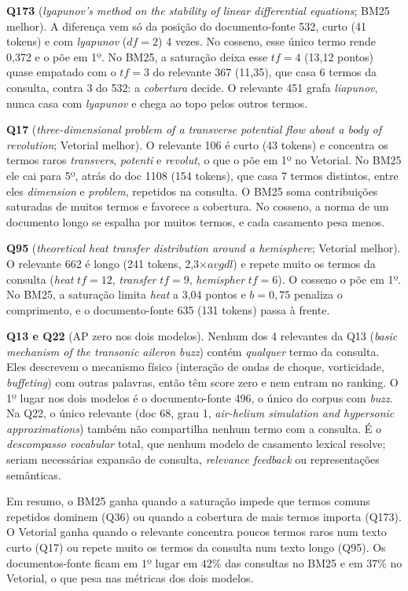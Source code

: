 \documentclass[10pt,a4paper]{article}
\newcommand{\term}[1]{\textit{#1}}      %
\begin{document}
\textbf{Q173} (\term{lyapunov's method on the stability of linear differential equations}; BM25 melhor). A diferença vem só da posição do documento-fonte 532, curto (41 tokens) e com \term{lyapunov} ($df=2$) 4 vezes. No cosseno, esse único termo rende 0,372 e o põe em 1º. No BM25, a saturação deixa esse $tf=4$ (13,12 pontos) quase empatado com o $tf=3$ do relevante 367 (11,35), que casa 6 termos da consulta, contra 3 do 532: a \emph{cobertura} decide. O relevante 451 grafa \term{liapunov}, nunca casa com \term{lyapunov} e chega ao topo pelos outros termos.

\textbf{Q17} (\term{three-dimensional problem of a transverse potential flow about a body of revolution}; Vetorial melhor). O relevante 106 é curto (43 tokens) e concentra os termos raros \term{transvers}, \term{potenti} e \term{revolut}, o que o põe em 1º no Vetorial. No BM25 ele cai para 5º, atrás do doc 1108 (154 tokens), que casa 7 termos distintos, entre eles \term{dimension} e \term{problem}, repetidos na consulta. O BM25 soma contribuições saturadas de muitos termos e favorece a cobertura. No cosseno, a norma de um documento longo se espalha por muitos termos, e cada casamento pesa menos.

\textbf{Q95} (\term{theoretical heat transfer distribution around a hemisphere}; Vetorial melhor). O relevante 662 é longo (241 tokens, 2,3$\times avgdl$) e repete muito os termos da consulta (\term{heat} $tf=12$, \term{transfer} $tf=9$, \term{hemispher} $tf=6$). O cosseno o põe em 1º. No BM25, a saturação limita \term{heat} a 3,04 pontos e $b=0{,}75$ penaliza o comprimento, e o documento-fonte 635 (131 tokens) passa à frente.

\textbf{Q13 e Q22} (AP zero nos dois modelos). Nenhum dos 4 relevantes da Q13 (\term{basic mechanism of the transonic aileron buzz}) contém \emph{qualquer} termo da consulta. Eles descrevem o mecanismo físico (interação de ondas de choque, vorticidade, \term{buffeting}) com outras palavras, então têm score zero e nem entram no ranking. O 1º lugar nos dois modelos é o documento-fonte 496, o único do corpus com \term{buzz}. Na Q22, o único relevante (doc 68, grau 1, \term{air-helium simulation and hypersonic approximations}) também não compartilha nenhum termo com a consulta. É o \emph{descompasso vocabular} total, que nenhum modelo de casamento lexical resolve; seriam necessárias expansão de consulta, \term{relevance feedback} ou representações semânticas.

Em resumo, o BM25 ganha quando a saturação impede que termos comuns repetidos dominem (Q36) ou quando a cobertura de mais termos importa (Q173). O Vetorial ganha quando o relevante concentra poucos termos raros num texto curto (Q17) ou repete muito os termos da consulta num texto longo (Q95). Os documentos-fonte ficam em 1º lugar em 42\% das consultas no BM25 e em 37\% no Vetorial, o que pesa nas métricas dos dois modelos.
\end{document}
